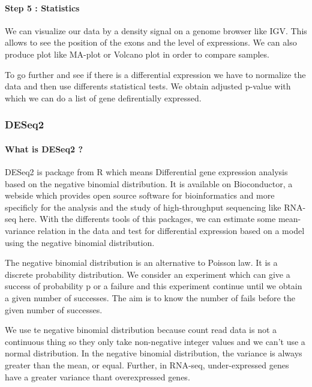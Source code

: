 \documentclass[]{article}
\let\oldparagraph\paragraph
\renewcommand{\paragraph}[1]{\oldparagraph{#1}\mbox{}}
\begin{document}
\paragraph{Step 5 : Statistics}\label{step-5-statistics}

We can visualize our data by a density signal on a genome browser like
IGV. This allows to see the position of the exons and the level of
expressions. We can also produce plot like MA-plot or Volcano plot in
order to compare samples.

To go further and see if there is a differential expression we have to
normalize the data and then use differents statistical tests. We obtain
adjusted p-value with which we can do a list of gene defirentially
expressed.

\subsubsection{DESeq2}\label{deseq2}

\paragraph{What is DESeq2 ?}\label{what-is-deseq2}

DESeq2 is package from R which means Differential gene expression
analysis based on the negative binomial distribution. It is available on
Bioconductor, a webside which provides open source software for
bioinformatics and more specificly for the analysis and the study of
high-throughput sequencing like RNA-seq here. With the differents tools
of this packages, we can estimate some mean-variance relation in the
data and test for differential expression based on a model using the
negative binomial distribution.

The negative binomial distribution is an alternative to Poisson law. It
is a discrete probability distribution. We consider an experiment which
can give a success of probability p or a failure and this experiment
continue until we obtain a given number of successes. The aim is to know
the number of fails before the given number of successes.

We use te negative binomial distribution because count read data is not
a continuous thing so they only take non-negative integer values and we
can't use a normal distribution. In the negative binomial distribution,
the variance is always greater than the mean, or equal. Further, in
RNA-seq, under-expressed genes have a greater variance thant
overexpressed genes.
\end{document}
